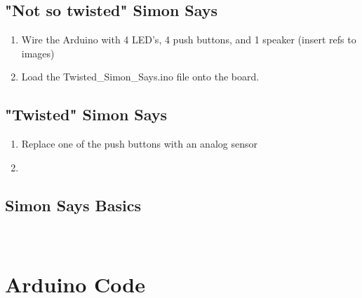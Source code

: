 \documentclass[12pt,letterpaper,oneside]{article}
\begin{document}
		\subsection{"Not so twisted" Simon Says}
			\begin{enumerate}
				\item Wire the Arduino with 4 LED's, 4 push buttons, and 1 speaker (insert refs to images)
				\item Load the Twisted\_Simon\_Says.ino file onto the board.
			\end{enumerate}
								
		\subsection{"Twisted" Simon Says}
			\begin{enumerate}
				\item Replace one of the push buttons with an analog sensor
				\item 
			\end{enumerate}
		
		\subsection{Simon Says Basics} \label{sec:simon}

\newpage
\appendix
\section{\\Arduino Code} \label{App:AppendixA}

	
\newpage		
\printbibliography
\end{document}
